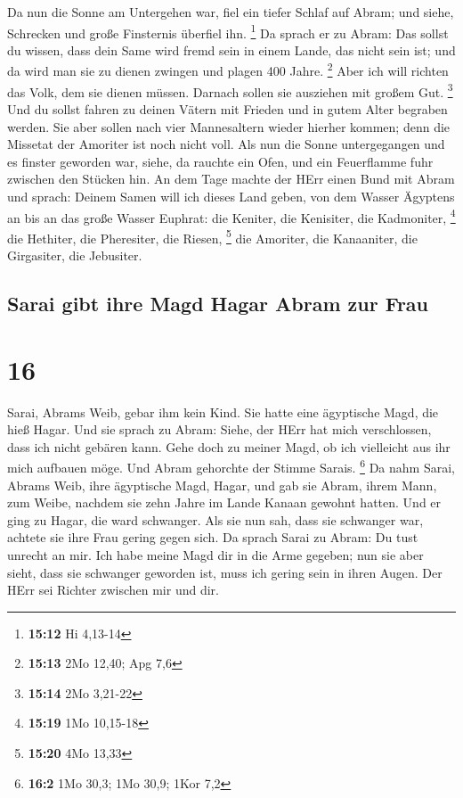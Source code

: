  Da nun die Sonne am Untergehen war, fiel ein tiefer
Schlaf auf Abram; und siehe, Schrecken und große Finsternis überfiel
ihn. \footnote{\textbf{15:12} Hi 4,13-14}  Da sprach er
zu Abram: Das sollst du wissen, dass dein Same wird fremd sein in einem
Lande, das nicht sein ist; und da wird man sie zu dienen zwingen und
plagen 400 Jahre. \footnote{\textbf{15:13} 2Mo 12,40; Apg 7,6}
 Aber ich will richten das Volk, dem sie dienen müssen.
Darnach sollen sie ausziehen mit großem Gut. \footnote{\textbf{15:14}
  2Mo 3,21-22}  Und du sollst fahren zu deinen Vätern mit
Frieden und in gutem Alter begraben werden.  Sie aber
sollen nach vier Mannesaltern wieder hierher kommen; denn die Missetat
der Amoriter ist noch nicht voll.  Als nun die Sonne
untergegangen und es finster geworden war, siehe, da rauchte ein Ofen,
und ein Feuerflamme fuhr zwischen den Stücken hin.  An
dem Tage machte der HErr einen Bund mit Abram und sprach: Deinem Samen
will ich dieses Land geben, von dem Wasser Ägyptens an bis an das große
Wasser Euphrat:  die Keniter, die Kenisiter, die
Kadmoniter, \footnote{\textbf{15:19} 1Mo 10,15-18}  die
Hethiter, die Pheresiter, die Riesen, \footnote{\textbf{15:20} 4Mo 13,33}
 die Amoriter, die Kanaaniter, die Girgasiter, die
Jebusiter.

\hypertarget{sarai-gibt-ihre-magd-hagar-abram-zur-frau}{%
\subsection{Sarai gibt ihre Magd Hagar Abram zur
Frau}\label{sarai-gibt-ihre-magd-hagar-abram-zur-frau}}

\hypertarget{section-15}{%
\section{16}\label{section-15}}

 Sarai, Abrams Weib, gebar ihm kein Kind. Sie hatte eine
ägyptische Magd, die hieß Hagar.  Und sie sprach zu Abram:
Siehe, der HErr hat mich verschlossen, dass ich nicht gebären kann. Gehe
doch zu meiner Magd, ob ich vielleicht aus ihr mich aufbauen möge. Und
Abram gehorchte der Stimme Sarais. \footnote{\textbf{16:2} 1Mo 30,3; 1Mo
  30,9; 1Kor 7,2}  Da nahm Sarai, Abrams Weib, ihre
ägyptische Magd, Hagar, und gab sie Abram, ihrem Mann, zum Weibe,
nachdem sie zehn Jahre im Lande Kanaan gewohnt hatten. 
Und er ging zu Hagar, die ward schwanger. Als sie nun sah, dass sie
schwanger war, achtete sie ihre Frau gering gegen sich. 
Da sprach Sarai zu Abram: Du tust unrecht an mir. Ich habe meine Magd
dir in die Arme gegeben; nun sie aber sieht, dass sie schwanger geworden
ist, muss ich gering sein in ihren Augen. Der HErr sei Richter zwischen
mir und dir.

